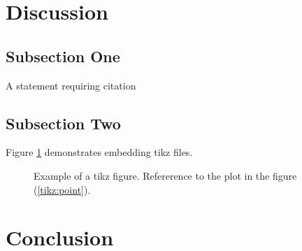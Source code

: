 \documentclass[twoside,twocolumn]{article}
\theoremstyle{mytheoremstyle}
\begin{document}
\par \blindtext %



\par \blindtext %


\section{Discussion}

\subsection{Subsection One}
\par \blindtext %
A statement requiring citation \cite{Wei2008}
\par \blindtext %
\subsection{Subsection Two}
\par \blindtext %
\par Figure \ref{fig:tikz} demonstrates embedding tikz files.
\par \blindtext %
\begin{figure}[!t]
	\centering
	
	\caption{Example of a tikz figure. Refererence to the plot in the figure (\ref{tikz:point}).}\label{fig:tikz}
\end{figure}
\section{Conclusion}
\blindtext

\printbibliography

\end{document}
